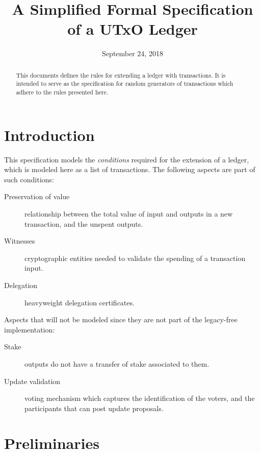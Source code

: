 \documentclass[11pt,a4paper]{article}
\begin{document}
\title{A Simplified Formal Specification of a UTxO Ledger}

\author{}

\date{September 24, 2018}

\maketitle

\begin{abstract}
This documents defines the rules for extending a ledger with transactions. It
is intended to serve as the specification for random generators of transactions
which adhere to the rules presented here.
\end{abstract}

\tableofcontents
\listoffigures

\section{Introduction}
\label{sec:introduction}

This specification models the \textit{conditions} required for the extension of
a ledger, which is modeled here as a list of transactions. The following
aspects are part of such conditions:

\begin{description}
\item[Preservation of value] relationship between the total value of input and outputs
  in a new transaction, and the unspent outputs.
\item[Witnesses] cryptographic entities needed to validate the spending
  of a transaction input.
\item[Delegation] heavyweight delegation certificates.  
\end{description}

Aspects that will not be modeled since they are not part of the legacy-free
implementation:
\begin{description}
\item[Stake] outputs do not have a transfer of stake associated to them.
\item[Update validation] voting mechanism which captures the identification of
  the voters, and the participants that can post update proposals.
\end{description}
\section{Preliminaries}\label{sec:preliminaries}
\end{document}
